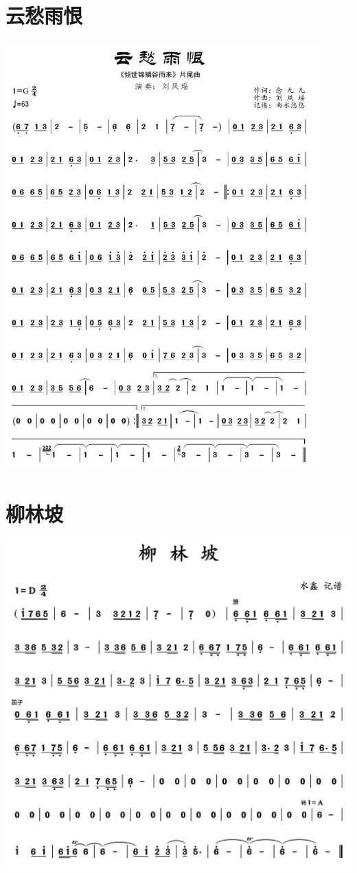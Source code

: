 \documentclass[cn,pad,twocol]{elegantbook}
\begin{document}
\section{云愁雨恨}
    \includegraphics[width=0.9\textwidth]{rpi400/20201226云愁雨恨.png}
 \section{柳林坡}
    \includegraphics[width=\textwidth]{dongxiao/20201231-柳林坡}
\end{document}
